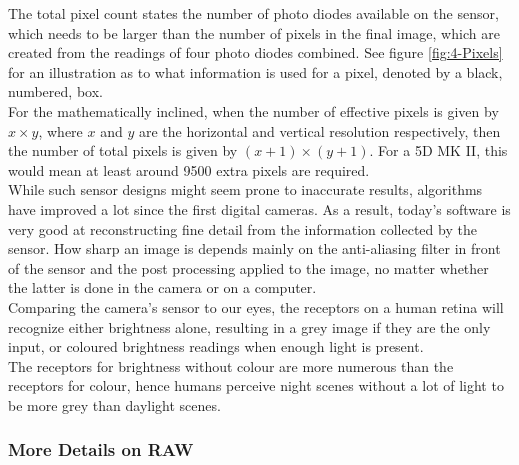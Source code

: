 The total pixel count states the number of photo diodes available on the \gls{sensor}, which needs to be larger than the number of pixels in the final image, which are created from the readings of four photo diodes combined. See figure \ref{fig:4-Pixels} for an illustration as to what information is used for a pixel, denoted by a black, numbered, box.
\\
For the mathematically inclined, when the number of effective pixels is given by $x \times y$, where $x$ and $y$ are the horizontal and vertical resolution respectively, then the number of total pixels is given by $\left( x +1 \right) \times \left(y + 1 \right)$. For a 5D MK II, this would mean at least around 9500 extra pixels are required.
\\[\baselineskip]
While such sensor designs might seem prone to inaccurate results, algorithms have improved a lot since the first digital cameras. As a result, today's software is very good at reconstructing fine detail from the information collected by the \gls{sensor}. How sharp an image is depends mainly on the anti-aliasing filter in front of the sensor and the post processing applied to the image, no matter whether the latter is done in the camera or on a computer.
\\[\baselineskip]
Comparing the camera's \gls{sensor} to our eyes, the receptors on a human retina will recognize either brightness alone, resulting in a grey image if they are the only input, or coloured brightness readings when enough light is present.
\\
The receptors for brightness without colour are more numerous than the receptors for colour, hence humans perceive night scenes without a lot of light to be more grey than daylight scenes.


\subsubsection{More Details on RAW}

